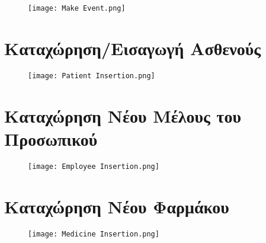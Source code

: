 \documentclass{article}
\begin{document}
\vspace{0.2cm}

\begin{figure}[!htb]
        \centering
        \texttt{[image: Make Event.png]}
\end{figure}

\newpage

\section{Καταχώρηση/Εισαγωγή Ασθενούς}

\vspace{0.2cm}

\begin{figure}[!htb]
        \centering
        \texttt{[image: Patient Insertion.png]}
\end{figure}

\newpage

\section{Καταχώρηση Νέου Μέλους του Προσωπικού}

\vspace{0.2cm}

\begin{figure}[!htb]
        \centering
        \texttt{[image: Employee Insertion.png]}
\end{figure}

\newpage

\section{Καταχώρηση Νέου Φαρμάκου}

\vspace{0.2cm}

\begin{figure}[!htb]
        \centering
        \texttt{[image: Medicine Insertion.png]}
\end{figure}
\end{document}
